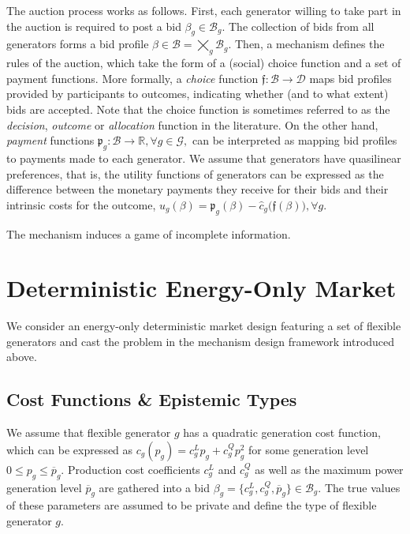 \documentclass{article}
\begin{document}
The auction process works as follows. First, each generator willing to take part in the auction is required to post a bid $\beta_g \in \mathcal{B}_g$. The collection of bids from all generators forms a bid profile $\beta \in \mathcal{B} = \bigtimes_g \mathcal{B}_g$. Then, a mechanism defines the rules of the auction, which take the form of a (social) choice function and a set of payment functions. More formally, a \textit{choice} function $\mathfrak{f}: \mathcal{B} \rightarrow \mathcal{D}$ maps bid profiles provided by participants to outcomes, indicating whether (and to what extent) bids are accepted. Note that the choice function is sometimes referred to as the \textit{decision}, \textit{outcome} or \textit{allocation} function in the literature. On the other hand, \textit{payment} functions $\mathfrak{p}_g: \mathcal{B} \rightarrow \mathbb{R}, \forall g \in \mathcal{G},$  can be interpreted as mapping bid profiles to payments made to each generator. We assume that generators have quasilinear preferences, that is, the utility functions of generators can be expressed as the difference between the monetary payments they receive for their bids and their intrinsic costs for the outcome, $u_g(\beta) = \mathfrak{p}_g(\beta) - \hat{c}_g\big(\mathfrak{f}(\beta)\big), \forall g$.

The mechanism induces a game of incomplete information.

\section{Deterministic Energy-Only Market}

We consider an energy-only deterministic market design featuring a set of flexible generators and cast the problem in the mechanism design framework introduced above.

\subsection{Cost Functions \& Epistemic Types}

We assume that flexible generator $g$ has a quadratic generation cost function, which can be expressed as $c_g(p_g) = c_g^L p_g + c_g^Q p_g^2$ for some generation level $0 \le p_g \le \overline{p}_g$. Production cost coefficients $c_g^L$ and $c_g^Q$ as well as the maximum power generation level $\overline{p}_g$ are gathered into a bid $\beta_g = \{c_g^L, c_g^Q, \overline{p}_g\} \in \mathcal{B}_g$. The true values of these parameters are assumed to be private and define the type of flexible generator $g$. 
\end{document}
